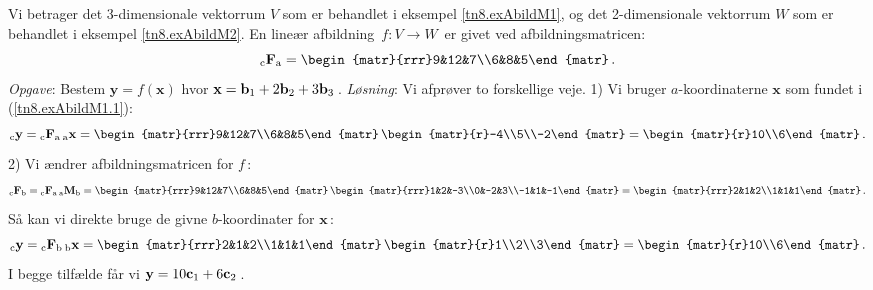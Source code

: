 \begin{example}%
Vi betrager det 3-dimensionale vektorrum $V$ som er behandlet i eksempel \ref{tn8.exAbildM1}, og det 2-dimensionale vektorrum $W$ som er behandlet i eksempel \ref{tn8.exAbildM2}. En lineær afbildning $\,f:V\rightarrow W\,$ er givet ved afbildningsmatricen:
$$
\matind cFa=\begin{matr}{rrr}9&12&7\\6&8&5\end{matr}\,.
$$
\textit{Opgave}: Bestem $\mathbf y=f(\mathbf x)$ hvor $\mathbf x=\mathbf{b}_1+2\mathbf{b}_2+3\mathbf{b}_3\,$.\bs
\textit{Løsning}: Vi afprøver to forskellige veje.
1) Vi bruger $a$-koordinaterne $\mathbf x$ som fundet i (\ref{tn8.exAbildM1.1}):
$$\vekind cy=\matind cFa\,\vekind ax=
\begin{matr}{rrr}9&12&7\\6&8&5\end{matr}\,\begin{matr}{r}-4\\5\\-2\end{matr}
=\begin{matr}{r}10\\6\end{matr}\,.$$
2) Vi ændrer afbildningsmatricen for $f\,$:
$$
\matind cFb=\matind cFa\,\matind aMb =
\begin{matr}{rrr}9&12&7\\6&8&5\end{matr}\,
\begin{matr}{rrr}1&2&-3\\0&-2&3\\-1&1&-1\end{matr}
=\begin{matr}{rrr}2&1&2\\1&1&1\end{matr}\,.
$$
Så kan vi direkte bruge de givne $b$-koordinater for $\mathbf x\,$:
$$\vekind cy=\matind cFb\,\vekind bx=
\begin{matr}{rrr}2&1&2\\1&1&1\end{matr}\,\begin{matr}{r}1\\2\\3\end{matr}
=\begin{matr}{r}10\\6\end{matr}\,.$$
I begge tilfælde får vi $\mathbf y = 10\mathbf{c}_1+6\mathbf{c}_2\,$.
 
\end{example}
